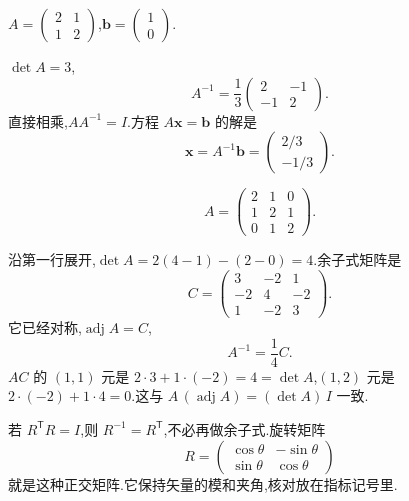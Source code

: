 \begin{example}
$A=\begin{pmatrix}2&1\\1&2\end{pmatrix}$,$\mathbf{b}=\begin{pmatrix}1\\0\end{pmatrix}$.
\end{example}
\begin{solution}
$\det A=3$,
\begin{equation}
  A^{-1}=\frac13\begin{pmatrix}2&-1\\-1&2\end{pmatrix}.
\end{equation}
直接相乘,$AA^{-1}=I$.方程 $A\mathbf{x}=\mathbf{b}$ 的解是
\begin{equation}
  \mathbf{x}=A^{-1}\mathbf{b}=\begin{pmatrix}2/3\\-1/3\end{pmatrix}.
\end{equation}
\end{solution}

\begin{example}
\begin{equation}
  A=\begin{pmatrix} 2&1&0\\ 1&2&1\\ 0&1&2 \end{pmatrix}.
\end{equation}
\end{example}
\begin{solution}
沿第一行展开,$\det A=2(4-1)-(2-0)=4$.余子式矩阵是
\begin{equation}
  C=\begin{pmatrix} 3&-2&1\\ -2&4&-2\\ 1&-2&3 \end{pmatrix}.
\end{equation}
它已经对称,$\operatorname{adj} A=C$,
\begin{equation}
  A^{-1}=\frac14 C.
\end{equation}
$A C$ 的 $(1,1)$ 元是 $2\cdot 3+1\cdot(-2)=4=\det A$,$(1,2)$ 元是 $2\cdot(-2)+1\cdot 4=0$.这与 $A\,(\operatorname{adj} A)=(\det A)\,I$ 一致.
\end{solution}

若 $R^{\mathsf T}R=I$,则 $R^{-1}=R^{\mathsf T}$,不必再做余子式.旋转矩阵
\begin{equation}
  R=\begin{pmatrix} \cos\theta & -\sin\theta \\ \sin\theta & \cos\theta \end{pmatrix}
\end{equation}
就是这种正交矩阵.它保持矢量的模和夹角,核对放在指标记号里.
